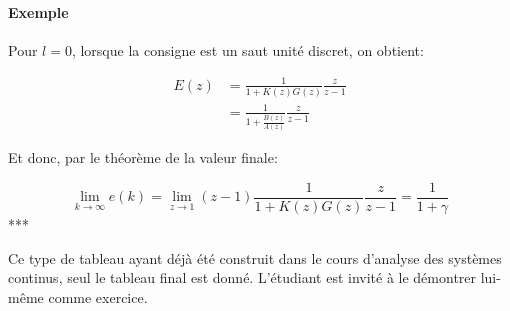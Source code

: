 \documentclass[11pt]{article}
\begin{document}
    \paragraph{Exemple}\label{exemple}

Pour \(l=0\), lorsque la consigne est un saut unité discret, on obtient:

\begin{align}
  E(z) &= \frac{1}{1+K(z)G(z)} \frac{z}{z-1} \\
       &= \frac{1}{1 + \frac{B(z)}{A(z)}} \frac{z}{z-1}
\end{align}

Et donc, par le théorème de la valeur finale:

\[ \lim_{k \rightarrow \infty} e(k) = \lim_{z \rightarrow 1} (z-1) \frac{1}{1+K(z)G(z)} \frac{z}{z-1} = \frac{1}{1+\gamma} \]
***

    Ce type de tableau ayant déjà été construit dans le cours d'analyse des
systèmes continus, seul le tableau final est donné. L'étudiant est
invité à le démontrer lui-même comme exercice.
\end{document}
